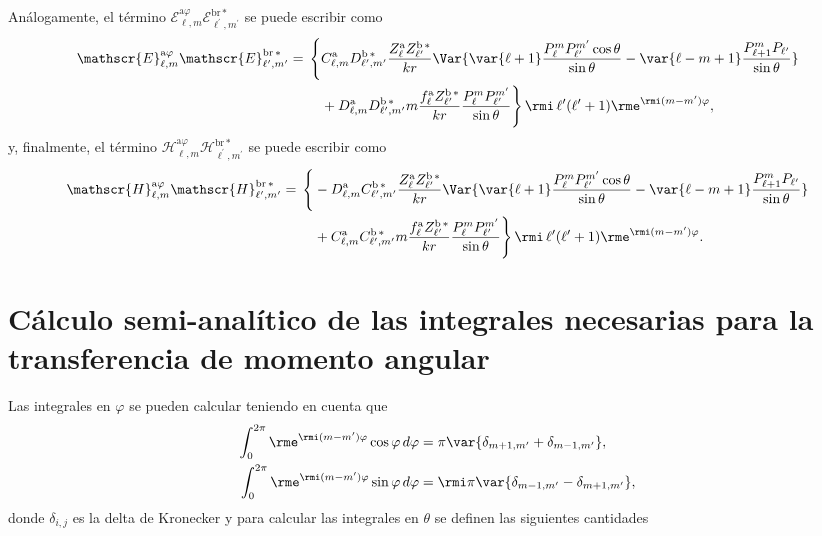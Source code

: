 %
Análogamente, el término $\mathscr{E}_{\ell, m}^{\text{a}\varphi}\mathscr{E}_{\ell^{\prime}, m^{\prime}}^{\text{br}\,*}$ se puede escribir como
\begin{align}
\mathscr{E}_{\ell, m}^{\text{a}\varphi}\mathscr{E}_{\ell^{\prime}, m^{\prime}}^{\text{br}\,*} = \, \Bigg\{& C_{\ell, m}^{\rm a} D_{\ell^{\prime}, m^{\prime}}^{\rm b \, *} \frac{Z_{\ell}^{\rm a} Z_{\ell^{\prime}}^{\rm b \, *}}{k r} \Var{\var{\ell +1} \frac{P_{\ell}^{m} P_{\ell^{\prime}}^{m^{\prime}}\cos\theta}{\sin\theta} -\var{\ell - m +1}\frac{P_{\ell+1}^m P_{\ell^{\prime}}}{\sin\theta} }\nonumber\\
& + D_{\ell, m}^{\rm a} D_{\ell^{\prime}, m^{\prime}}^{\rm b \, *} m \frac{f_{\ell}^{\rm a} Z_{\ell^{\prime}}^{\rm b\, *}}{k r} \frac{P_{\ell}^{m} P_{\ell^{\prime}}^{m^{\prime}}}{\sin\theta} \Bigg\} \, \rmi \, \ell^{\prime}(\ell^{\prime}+1)  \rme^{\rmi (m-m^{\prime})\varphi },
\end{align}
%
y, finalmente, el término $\mathscr{H}_{\ell, m}^{\text{a}\varphi}\mathscr{H}_{\ell^{\prime}, m^{\prime}}^{\text{br}\,*}$ se puede escribir como
\begin{align}
\mathscr{H}_{\ell, m}^{\text{a}\varphi}\mathscr{H}_{\ell^{\prime}, m^{\prime}}^{\text{br}\,*} = \, \Bigg\{& -D_{\ell, m}^{\rm a} C_{\ell^{\prime}, m^{\prime}}^{\rm b \, *} \frac{Z_{\ell}^{\rm a} Z_{\ell^{\prime}}^{\rm b \, *}}{k r} \Var{\var{\ell +1} \frac{P_{\ell}^{m} P_{\ell^{\prime}}^{m^{\prime}}\cos\theta}{\sin\theta} -\var{\ell - m +1}\frac{P_{\ell+1}^m P_{\ell^{\prime}}}{\sin\theta} }\nonumber\\
& + C_{\ell, m}^{\rm a} C_{\ell^{\prime}, m^{\prime}}^{\rm b \, *} m \frac{f_{\ell}^{\rm a} Z_{\ell^{\prime}}^{\rm b\, *}}{k r} \frac{P_{\ell}^{m} P_{\ell^{\prime}}^{m^{\prime}}}{\sin\theta} \Bigg\} \, \rmi \, \ell^{\prime}(\ell^{\prime}+1)  \rme^{\rmi (m-m^{\prime})\varphi }.
\end{align}

\section{Cálculo semi-analítico de las integrales necesarias para la transferencia de momento angular}
Las integrales en $\varphi$ se pueden calcular teniendo en cuenta que 
\begin{align}
\int_0^{2\pi} \rme^{\rmi (m-m^{\prime}) \varphi} \cos\varphi  \, d\varphi &= \pi \var{ \delta_{m+1, m^{\prime}} + \delta_{m-1, m^{\prime}} },\\
\int_0^{2\pi} \rme^{\rmi (m-m^{\prime}) \varphi} \sin\varphi  \, d\varphi &= \rmi \pi \var{ \delta_{m-1, m^{\prime}} - \delta_{m+1, m^{\prime}} },
\end{align}
\vspace{-0.8 cm}
donde $\delta_{i,j}$ es la delta de Kronecker y para calcular las integrales en $\theta$ se definen las siguientes cantidades

